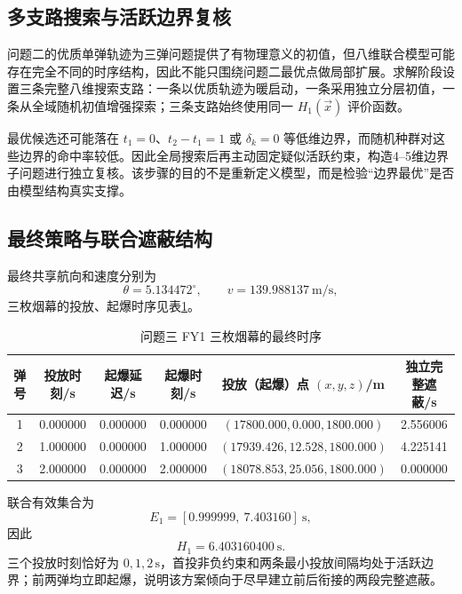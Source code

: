 \subsection{多支路搜索与活跃边界复核}
问题二的优质单弹轨迹为三弹问题提供了有物理意义的初值，但八维联合模型可能存在完全不同的时序结构，因此不能只围绕问题二最优点做局部扩展。求解阶段设置三条完整八维搜索支路：一条以优质轨迹为暖启动，一条采用独立分层初值，一条从全域随机初值增强探索；三条支路始终使用同一 $H_1(\vec x)$ 评价函数。

最优候选还可能落在 $t_1=0$、$t_2-t_1=1$ 或 $\delta_k=0$ 等低维边界，而随机种群对这些边界的命中率较低。因此全局搜索后再主动固定疑似活跃约束，构造4--5维边界子问题进行独立复核。该步骤的目的不是重新定义模型，而是检验“边界最优”是否由模型结构真实支撑。


\subsection{最终策略与联合遮蔽结构}
最终共享航向和速度分别为
\[
\theta=5.134472^\circ,\qquad v=139.988137\ \mathrm{m/s},
\]
三枚烟幕的投放、起爆时序见表\ref{tab:q3}。

\begin{table}[tbp]
\centering
\caption{问题三 FY1 三枚烟幕的最终时序}
\label{tab:q3}
\small
\begin{tabular}{cccccc}
\toprule
弹号 & 投放时刻/s & 起爆延迟/s & 起爆时刻/s & 投放（起爆）点 $(x,y,z)$/m & 独立完整遮蔽/s \\
\midrule
1 & 0.000000 & 0.000000 & 0.000000 & $(17800.000,0.000,1800.000)$ & 2.556006 \\
2 & 1.000000 & 0.000000 & 1.000000 & $(17939.426,12.528,1800.000)$ & 4.225141 \\
3 & 2.000000 & 0.000000 & 2.000000 & $(18078.853,25.056,1800.000)$ & 0.000000 \\
\bottomrule
\end{tabular}
\end{table}

联合有效集合为
\[
E_1=[0.999999,\ 7.403160]\ \mathrm s,
\]
因此
\begin{equation}
\boxed{H_1=6.403160400\ \mathrm s}.
\label{eq:q3-result}
\end{equation}
三个投放时刻恰好为 $0,1,2\,\mathrm s$，首投非负约束和两条最小投放间隔均处于活跃边界；前两弹均立即起爆，说明该方案倾向于尽早建立前后衔接的两段完整遮蔽。

